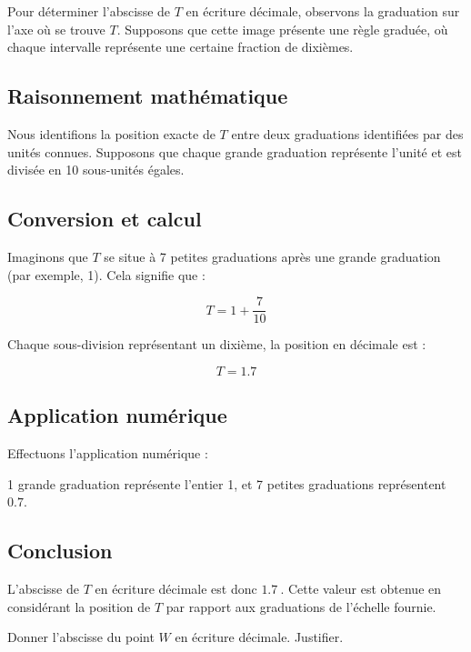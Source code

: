 \documentclass[answers]{exam}
\begin{document}
\begin{questions}
  

\begin{solution}
Pour déterminer l'abscisse de $T$ en écriture décimale, observons la graduation sur l'axe où se trouve $T$. Supposons que cette image présente une règle graduée, où chaque intervalle représente une certaine fraction de dixièmes.

\subsection*{Raisonnement mathématique}

Nous identifions la position exacte de $T$ entre deux graduations identifiées par des unités connues. Supposons que chaque grande graduation représente l'unité et est divisée en 10 sous-unités égales.

\subsection*{Conversion et calcul}

Imaginons que $T$ se situe à 7 petites graduations après une grande graduation (par exemple, 1). Cela signifie que :

\[
T = 1 + \frac{7}{10}
\]

Chaque sous-division représentant un dixième, la position en décimale est :

\[
T = 1.7
\]

\subsection*{Application numérique}

Effectuons l'application numérique :

1 grande graduation représente l'entier 1, et 7 petites graduations représentent \(0.7\).

\subsection*{Conclusion}

L'abscisse de $T$ en écriture décimale est donc \(\SI{1.7}{}\). Cette valeur est obtenue en considérant la position de $T$ par rapport aux graduations de l'échelle fournie.
\end{solution}

\question[1] Donner l'abscisse du point $W$ en écriture décimale. Justifier.
\end{questions}
\end{document}
